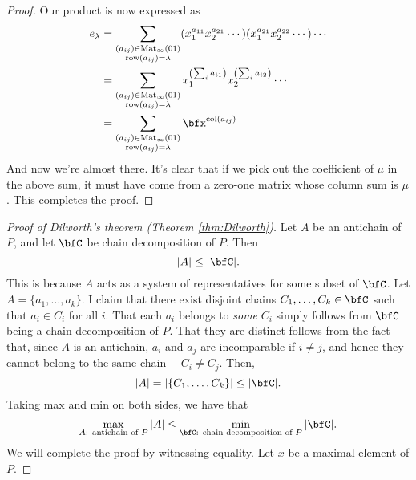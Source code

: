 \documentclass{article}
\DeclareMathOperator{\row}{row}
\DeclareMathOperator{\col}{col}
\DeclareMathOperator{\Mat}{Mat}
\begin{document}
\begin{proof}
    Our product is now expressed as
    \begin{align*}
        e_\lambda 
        &=
        \sum_{\substack{(a_{ij})\in\Mat_\infty(01)\\\row(a_{ij}) = \lambda}} (x_1^{a_{11}}x_2^{a_{21}}\cdots)(x_1^{a_{21}}x_2^{a_{22}}\cdots)\cdots \\
        &= 
        \sum_{\substack{(a_{ij})\in\Mat_\infty(01)\\\row(a_{ij}) = \lambda}} x_1^{\left(\sum_i a_{i1}\right)}x_2^{\left(\sum_i a_{i2}\right)} \cdots \\
        &= 
        \sum_{\substack{(a_{ij})\in\Mat_\infty(01)\\\row(a_{ij}) = \lambda}} \bfx^{\col(a_{ij})}
    \end{align*}
    And now we're almost there.
    It's clear that if we pick out the coefficient of $\mu$ in the above sum, it must have come from a zero-one matrix whose column sum is $\mu$.
    This completes the proof.
\end{proof}

\begin{proof}
    [Proof of Dilworth's theorem (Theorem \ref{thm:Dilworth})]
    \label{pf:Dilworth}
    Let $A$ be an antichain of $P$, and let $\bfC$ be chain decomposition of $P$.
    Then
    \[
        |A|
        \leq
        |\bfC|.
    \]
    This is because $A$ acts as a system of representatives for some subset of $\bfC$.
    Let $A = \{a_1,\ldots,a_k\}$.
    I claim that there exist disjoint chains $C_1, \ldots, C_k \in \bfC$ such that $a_i \in C_i$ for all $i$.
    That each $a_i$ belongs to \textit{some} $C_i$ simply follows from $\bfC$ being a chain decomposition of $P$.
    That they are distinct follows from the fact that, since $A$ is an antichain, $a_i$ and $a_j$ are incomparable if $i \neq j$, and hence they cannot belong to the same chain--- $C_i \neq C_j$.
    Then, 
    \[
        |A| = |\{C_1,\ldots,C_k\}| \leq |\bfC|.
    \]
    Taking max and min on both sides, we have that
    \[
        \max_\text{$A$: antichain of $P$}
        |A|
        \leq
        \min_\text{$\bfC$: chain decomposition of $P$}
        |\bfC|
        .
    \]
    We will complete the proof by witnessing equality.
    Let $x$ be a maximal element of $P$.
\end{proof}
\end{document}
